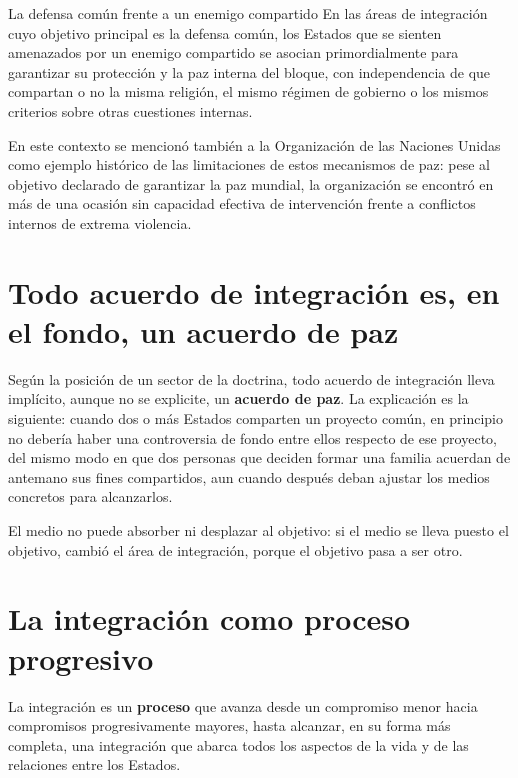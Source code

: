 \documentclass[12pt,oneside]{book}
\begin{document}
\begin{example}{La defensa común frente a un enemigo compartido}
En las áreas de integración cuyo objetivo principal es la defensa común, los Estados que se sienten amenazados por un enemigo compartido se asocian primordialmente para garantizar su protección y la paz interna del bloque, con independencia de que compartan o no la misma religión, el mismo régimen de gobierno o los mismos criterios sobre otras cuestiones internas.

En este contexto se mencionó también a la Organización de las Naciones Unidas como ejemplo histórico de las limitaciones de estos mecanismos de paz: pese al objetivo declarado de garantizar la paz mundial, la organización se encontró en más de una ocasión sin capacidad efectiva de intervención frente a conflictos internos de extrema violencia.
\end{example}

\section{Todo acuerdo de integración es, en el fondo, un acuerdo de paz}

Según la posición de un sector de la doctrina, todo acuerdo de integración lleva implícito, aunque no se explicite, un \textbf{acuerdo de paz}. La explicación es la siguiente: cuando dos o más Estados comparten un proyecto común, en principio no debería haber una controversia de fondo entre ellos respecto de ese proyecto, del mismo modo en que dos personas que deciden formar una familia acuerdan de antemano sus fines compartidos, aun cuando después deban ajustar los medios concretos para alcanzarlos.

\begin{important}
El medio no puede absorber ni desplazar al objetivo: si el medio se lleva puesto el objetivo, cambió el área de integración, porque el objetivo pasa a ser otro.
\end{important}

\section{La integración como proceso progresivo}

La integración es un \textbf{proceso} que avanza desde un compromiso menor hacia compromisos progresivamente mayores, hasta alcanzar, en su forma más completa, una integración que abarca todos los aspectos de la vida y de las relaciones entre los Estados.
\end{document}
